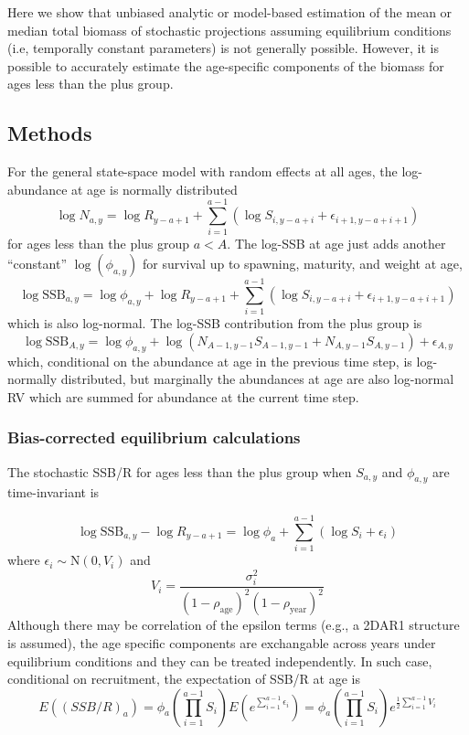 \documentclass[
]{article}
\begin{document}
Here we show that unbiased analytic or model-based estimation of the mean or median total biomass of stochastic projections assuming equilibrium conditions (i.e, temporally constant parameters) is not generally possible. However, it is possible to accurately estimate the age-specific components of the biomass for ages less than the plus group.

\hypertarget{methods}{%
\subsection*{Methods}\label{methods}}

For the general state-space model with random effects at all ages, the log-abundance at age is normally distributed
\[\log N_{a,y} = \log R_{y-a+1} + \sum^{a-1}_{i = 1}\left( \log S_{i,y-a+i} + \epsilon_{i+1,y-a+i+1}\right)\]
for ages less than the plus group \(a<A\). The log-SSB at age just adds another ``constant'' \(\log\left(\phi_{a,y}\right)\) for survival up to spawning, maturity, and weight at age,
\[\log \text{SSB}_{a,y} = \log \phi_{a,y} + \log R_{y-a+1} + \sum^{a-1}_{i = 1}\left( \log S_{i,y-a+i} + \epsilon_{i+1,y-a+i+1}\right)\]
which is also log-normal. The log-SSB contribution from the plus group is
\[
\log\text{SSB}_{A,y} = \log \phi_{a,y} +\log\left(N_{A-1,y-1} S_{A-1,y-1} + N_{A,y-1} S_{A,y-1}\right) +\epsilon_{A,y}
\]
which, conditional on the abundance at age in the previous time step, is log-normally distributed, but marginally the abundances at age are also log-normal RV which are summed for abundance at the current time step.

\hypertarget{bias-corrected-equilibrium-calculations}{%
\subsubsection*{Bias-corrected equilibrium calculations}\label{bias-corrected-equilibrium-calculations}}

The stochastic SSB/R for ages less than the plus group when \(S_{a,y}\) and \(\phi_{a,y}\) are time-invariant is

\[\log \text{SSB}_{a,y} - \log R_{y-a+1} = \log \phi_{a} + \sum^{a-1}_{i = 1} \left(\log S_{i} + \epsilon_{i}\right)\]
where \(\epsilon_{i} \sim \text{N}\left(0,V_i\right)\) and
\[
V_i = \frac{\sigma_i^2}{(1-\rho_{\text{age}})^2(1-\rho_{\text{year}})^2}
\]
Although there may be correlation of the epsilon terms (e.g., a 2DAR1 structure is assumed), the age specific components are exchangable across years under equilibrium conditions and they can be treated independently. In such case, conditional on recruitment, the expectation of SSB/R at age is
\begin{equation}\label{bcssbpr}
E((SSB/R)_a) = \phi_a \left(\prod_{i=1}^{a-1} S_i\right) E\left(e^{\sum_{i=1}^{a-1} \epsilon_i}\right)=\phi_a \left(\prod_{i=1}^{a-1} S_i\right) e^{\frac{1}{2}\sum_{i=1}^{a-1} V_i}
\end{equation}
\end{document}
